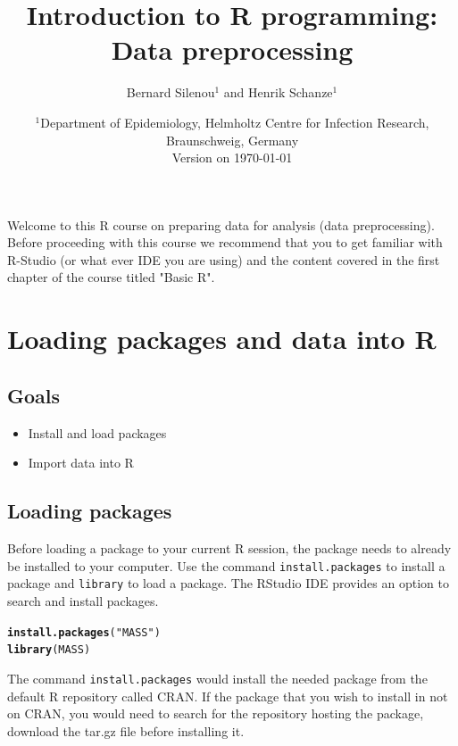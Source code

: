 \documentclass[a4paper]{article}\usepackage[]{graphicx}\usepackage[]{xcolor}
\title{Introduction to R programming: Data preprocessing}
\author{Bernard Silenou$^1$ and Henrik Schanze$^1$}
\date{%
    $^{1}$Department of Epidemiology, Helmholtz Centre for Infection Research, Braunschweig, Germany\\%
   \vspace{2em} 
   Version on \today
}
\makeatletter
\newcommand{\hlstr}[1]{\textcolor[rgb]{0.192,0.494,0.8}{#1}}%
\newcommand{\hlstd}[1]{\textcolor[rgb]{0.345,0.345,0.345}{#1}}%
\newcommand{\hlkwd}[1]{\textcolor[rgb]{0.737,0.353,0.396}{\textbf{#1}}}%
\newenvironment{kframe}{%
 \def\at@end@of@kframe{}%
 \ifinner\ifhmode%
  \def\at@end@of@kframe{\end{minipage}}%
  \begin{minipage}{\columnwidth}%
 \fi\fi%
 \def\FrameCommand##1{\hskip\@totalleftmargin \hskip-\fboxsep
 \colorbox{shadecolor}{##1}\hskip-\fboxsep
     \hskip-\linewidth \hskip-\@totalleftmargin \hskip\columnwidth}%
 \MakeFramed {\advance\hsize-\width
   \@totalleftmargin\z@ \linewidth\hsize
   \@setminipage}}%
 {\par\unskip\endMakeFramed%
 \at@end@of@kframe}
\newenvironment{knitrout}{}{} %
\makeatother
\begin{document}
\maketitle
\vfill
\tableofcontents
\clearpage



\noindent Welcome to this R course on preparing data for analysis (data preprocessing). Before proceeding with this course we recommend that you to get familiar with R-Studio (or what ever IDE you are using) and the content covered in the first chapter of the course titled "Basic R".

\section{Loading packages and data into R}
\subsection*{Goals}
\begin{itemize}
\item Install and load packages
\item Import data into  R
\end{itemize} 

\subsection{Loading packages}
Before loading a package to  your current R session, the package needs to already be installed to your computer. Use the command \texttt{install.packages} to install a package and \texttt{library} to load a package. The RStudio IDE provides an option to search and install  packages. 

\begin{knitrout}
\color{fgcolor}\begin{kframe}
\begin{alltt}
\hlkwd{install.packages}\hlstd{(}\hlstr{"MASS"}\hlstd{)}
\hlkwd{library}\hlstd{(MASS)}
\end{alltt}
\end{kframe}
\end{knitrout}

\noindent The command \texttt{install.packages} would install the needed package from the default R repository called CRAN. If the package that you wish to install in not on CRAN, you would need to search for the repository hosting the package, download the tar.gz file before installing it.
\end{document}
